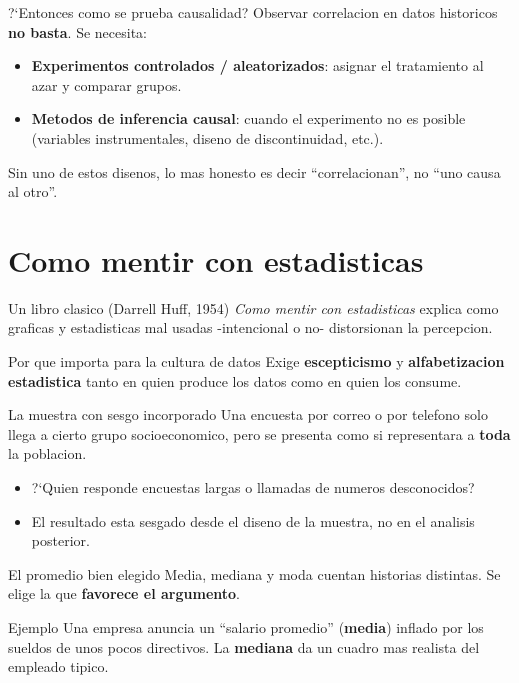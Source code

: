 \documentclass[aspectratio=169]{beamer}
\begin{document}
\begin{frame}{?`Entonces como se prueba causalidad?}
  Observar correlacion en datos historicos \textbf{no basta}. Se necesita:
  \begin{itemize}
    \item \textbf{Experimentos controlados / aleatorizados}: asignar el
          tratamiento al azar y comparar grupos.
    \item \textbf{Metodos de inferencia causal}: cuando el experimento no es
          posible (variables instrumentales, diseno de discontinuidad, etc.).
  \end{itemize}
  \vspace{0.3em}
  Sin uno de estos disenos, lo mas honesto es decir ``correlacionan'', no
  ``uno causa al otro''.
\end{frame}

\section{Como mentir con estadisticas}

\begin{frame}{Un libro clasico (Darrell Huff, 1954)}
  \emph{Como mentir con estadisticas} explica como graficas y estadisticas mal
  usadas -intencional o no- distorsionan la percepcion.
  \begin{block}{Por que importa para la cultura de datos}
    Exige \textbf{escepticismo} y \textbf{alfabetizacion estadistica} tanto en
    quien produce los datos como en quien los consume.
  \end{block}
\end{frame}

\begin{frame}{La muestra con sesgo incorporado}
  Una encuesta por correo o por telefono solo llega a cierto grupo
  socioeconomico, pero se presenta como si representara a \textbf{toda} la
  poblacion.
  \begin{itemize}
    \item ?`Quien responde encuestas largas o llamadas de numeros
          desconocidos?
    \item El resultado esta sesgado desde el diseno de la muestra, no en el
          analisis posterior.
  \end{itemize}
\end{frame}

\begin{frame}{El promedio bien elegido}
  Media, mediana y moda cuentan historias distintas. Se elige la que
  \textbf{favorece el argumento}.
  \begin{block}{Ejemplo}
    Una empresa anuncia un ``salario promedio'' (\textbf{media}) inflado por
    los sueldos de unos pocos directivos. La \textbf{mediana} da un cuadro mas
    realista del empleado tipico.
  \end{block}
\end{frame}
\end{document}
